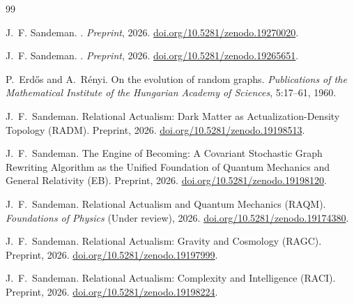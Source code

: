 \documentclass[11pt,a4paper]{article}
\theoremstyle{remark}
\begin{document}
\begin{thebibliography}{99}

J.~F. Sandeman.
.
\newblock \textit{Preprint}, 2026.
\newblock \href{https://doi.org/10.5281/zenodo.19270020}{doi.org/10.5281/zenodo.19270020}.


J.~F. Sandeman.
.
\newblock \textit{Preprint}, 2026.
\newblock \href{https://doi.org/10.5281/zenodo.19265651}{doi.org/10.5281/zenodo.19265651}.


P.~Erd\H{o}s and A.~R\'{e}nyi.
\newblock On the evolution of random graphs.
\newblock \emph{Publications of the Mathematical Institute of the Hungarian
  Academy of Sciences}, 5:17--61, 1960.

J.~F.~Sandeman.
\newblock Relational Actualism: Dark Matter as Actualization-Density Topology ({RADM}).
\newblock Preprint, 2026.
\newblock \href{https://doi.org/10.5281/zenodo.19198513}{doi.org/10.5281/zenodo.19198513}.

J.~F.~Sandeman.
\newblock The Engine of Becoming: A Covariant Stochastic Graph Rewriting Algorithm as the Unified Foundation of Quantum Mechanics and General Relativity ({EB}).
\newblock Preprint, 2026.
\newblock \href{https://doi.org/10.5281/zenodo.19198120}{doi.org/10.5281/zenodo.19198120}.

J.~F.~Sandeman.
\newblock Relational Actualism and Quantum Mechanics ({RAQM}).
\newblock \textit{Foundations of Physics} (Under review), 2026.
\newblock \href{https://doi.org/10.5281/zenodo.19174380}{doi.org/10.5281/zenodo.19174380}.

J.~F.~Sandeman.
\newblock Relational Actualism: Gravity and Cosmology ({RAGC}).
\newblock Preprint, 2026.
\newblock \href{https://doi.org/10.5281/zenodo.19197999}{doi.org/10.5281/zenodo.19197999}.

J.~F.~Sandeman.
\newblock Relational Actualism: Complexity and Intelligence ({RACI}).
\newblock Preprint, 2026.
\newblock \href{https://doi.org/10.5281/zenodo.19198224}{doi.org/10.5281/zenodo.19198224}.


\end{thebibliography}
\end{document}
